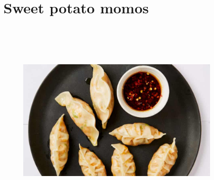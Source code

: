 \documentclass{book}
\begin{document}
\section{Sweet potato momos}
\begin{figure}
\centering\includegraphics[width=10cm,height=10cm,keepaspectratio]{Recipe_Pictures/Sweet_potato_momos.png}
\end{figure}
\end{document}
